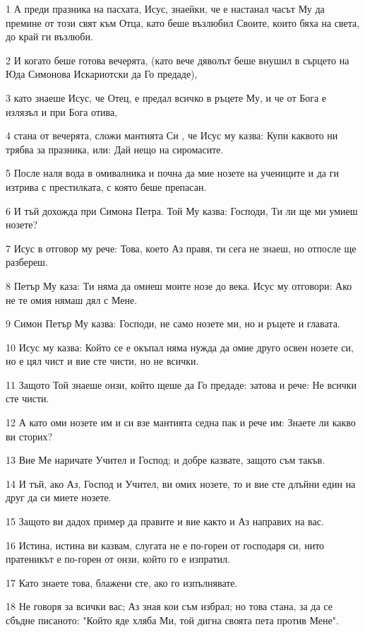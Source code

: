 \par 1 А преди празника на пасхата, Исус, знаейки, че е настанал часът Му да премине от този свят към Отца, като беше възлюбил Своите, които бяха на света, до край ги възлюби.
\par 2 И когато беше готова вечерята, (като вече дяволът беше внушил в сърцето на Юда Симонова Искариотски да Го предаде),
\par 3 като знаеше Исус, че Отец, е предал всичко в ръцете Му, и че от Бога е излязъл и при Бога отива,
\par 4 стана от вечерята, сложи мантията Си , че Исус му казва: Купи каквото ни трябва за празника, или: Дай нещо на сиромасите.
\par 5 После наля вода в омивалника и почна да мие нозете на учениците и да ги изтрива с престилката, с която беше препасан.
\par 6 И тъй дохожда при Симона Петра. Той Му казва: Господи, Ти ли ще ми умиеш нозете?
\par 7 Исус в отговор му рече: Това, което Аз правя, ти сега не знаеш, но отпосле ще разбереш.
\par 8 Петър Му каза: Ти няма да омиеш моите нозе до века. Исус му отговори: Ако не те омия нямаш дял с Мене.
\par 9 Симон Петър Му казва: Господи, не само нозете ми, но и ръцете и главата.
\par 10 Исус му казва: Който се е окъпал няма нужда да омие друго освен нозете си, но е цял чист и вие сте чисти, но не всички.
\par 11 Защото Той знаеше онзи, който щеше да Го предаде: затова и рече: Не всички сте чисти.
\par 12 А като оми нозете им и си взе мантията седна пак и рече им: Знаете ли какво ви сторих?
\par 13 Вие Ме наричате Учител и Господ; и добре казвате, защото съм такъв.
\par 14 И тъй, ако Аз, Господ и Учител, ви омих нозете, то и вие сте длъйни един на друг да си миете нозете.
\par 15 Защото ви дадох пример да правите и вие както и Аз направих на вас.
\par 16 Истина, истина ви казвам, слугата не е по-горен от господаря си, нито пратеникът е по-горен от онзи, който го е изпратил.
\par 17 Като знаете това, блажени сте, ако го изпълнявате.
\par 18 Не говоря за всички вас; Аз зная кои съм избрал; но това стана, за да се сбъдне писаното: "Който яде хляба Ми, той дигна своята пета против Мене".
